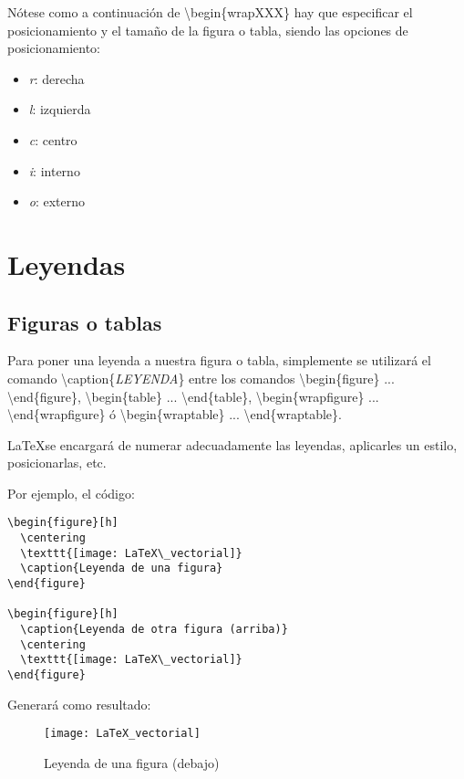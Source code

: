 Nótese como a continuación de \textbackslash begin\{wrapXXX\} hay que especificar el posicionamiento y el tamaño de la figura o tabla, siendo las opciones de posicionamiento: 
\begin{itemize}
	\item \emph{r}: derecha
	\item \emph{l}: izquierda
	\item \emph{c}: centro
	\item \emph{i}: interno
	\item \emph{o}: externo
\end{itemize}

\section{Leyendas}

\subsection{Figuras o tablas}

Para poner una leyenda a nuestra figura o tabla, simplemente se utilizará el comando \textbackslash caption\{\emph{LEYENDA}\} entre los comandos \textbackslash begin\{figure\} ... \textbackslash end\{figure\}, \textbackslash begin\{table\} ... \textbackslash end\{table\}, \textbackslash begin\{wrapfigure\} ... \textbackslash end\{wrapfigure\} ó \textbackslash begin\{wraptable\} ... \textbackslash end\{wraptable\}.

\LaTeX se encargará de numerar adecuadamente las leyendas, aplicarles un estilo, posicionarlas, etc.

Por ejemplo, el código:

\begin{lstlisting}
\begin{figure}[h]
  \centering
  \texttt{[image: LaTeX\_vectorial]}
  \caption{Leyenda de una figura}	
\end{figure}

\begin{figure}[h]
  \caption{Leyenda de otra figura (arriba)}	
  \centering
  \texttt{[image: LaTeX\_vectorial]}
\end{figure}
\end{lstlisting}

Generará como resultado:

\begin{figure}[h]
	\centering
	\texttt{[image: LaTeX\_vectorial]}
	\caption{Leyenda de una figura (debajo)}	
\end{figure}

